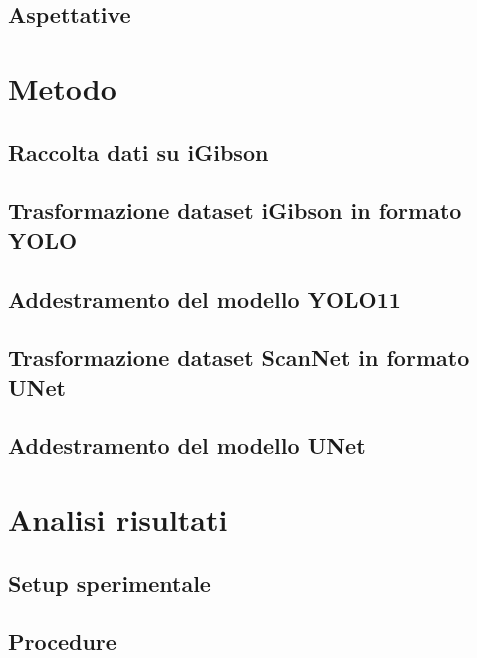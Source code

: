 \documentclass[12pt]{report}
\begin{document}
\section{Aspettative}
\label{chap:aspettative}

\chapter{Metodo}
\label{chap:metodo}

\section{Raccolta dati su iGibson}
\label{chap:raccolta_dati_igibson}

\section{Trasformazione dataset iGibson in formato YOLO}
\label{chap:dataset_igibson_yolo}

\section{Addestramento del modello YOLO11}
\label{chap:addestramento_yolo}

\section{Trasformazione dataset ScanNet in formato UNet}
\label{chap:dataset_scannet_unet}

\section{Addestramento del modello UNet}
\label{chap:addestramento_unet}

\chapter{Analisi risultati}
\label{chap:analisi}

\section{Setup sperimentale}
\label{chap:setup}

\section{Procedure}
\label{procedure}
\end{document}
